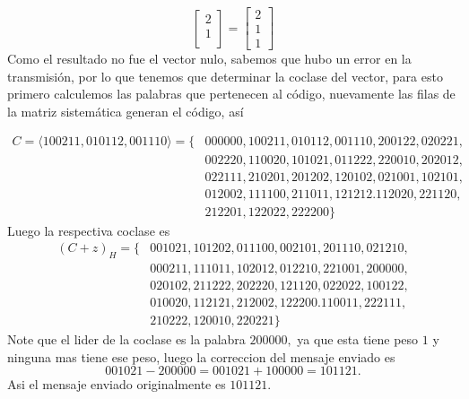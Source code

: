 \begin{itemize}
\begin{sols}
$$\begin{bmatrix}
            2\\
            1\\
        \end{bmatrix}=\begin{bmatrix}
            2\\
            1\\
            1
        \end{bmatrix}$$
        Como el resultado no fue el vector nulo, sabemos que hubo un error en la transmisión, por lo que tenemos que determinar la coclase del vector, para esto primero calculemos las palabras que pertenecen al código, nuevamente las filas de la matriz sistemática generan el código, así

        \begin{align*}
            C=\langle100211,010112,001110\rangle=\{&000000,100211,010112,001110,200122,020221,\\&002220,110020,101021,011222,220010,202012,\\&022111,210201,201202,120102,021001,102101,\\&012002,111100,211011,121212.112020,221120,\\&212201,122022,222200\}
        \end{align*}
        Luego la respectiva coclase es
        \begin{align*}
            (C+z)_H=\{&001021,101202,011100,002101,201110,021210,\\&000211,111011,102012,012210,221001,200000,\\&020102,211222,202220,121120,022022,100122,\\&010020,112121,212002,122200.110011,222111,\\&210222,120010,220221\}
        \end{align*}
        Note que el lider de la coclase es la palabra $200000,$ ya que esta tiene peso $1$ y ninguna mas tiene ese peso, luego la correccion del mensaje enviado es 
        $$001021-200000=001021+100000=101121.$$
        Asi el mensaje enviado originalmente es $101121.$
        
    \end{sols}
\end{itemize}
